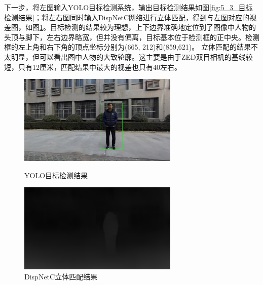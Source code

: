下一步，将左图输入YOLO目标检测系统，输出目标检测结果如图\ref{fig:5_3_目标检测结果}；将左右图同时输入DispNetC网络进行立体匹配，得到与左图对应的视差图，如图\ref{fig:5_3_立体匹配结果}。目标检测的结果较为理想，上下边界准确地定位到了图像中人物的头顶与脚下，左右边界略宽，但并没有偏离，目标基本位于检测框的正中央。检测框的左上角和右下角的顶点坐标分别为(665, 212)和(859,621)。
立体匹配的结果不太明显，但可以看出图中人物的大致轮廓。这主要是由于ZED双目相机的基线较短，只有12厘米，匹配结果中最大的视差也只有40左右。
\begin{figure}[htb] %
	\centering
	\begin{minipage}[c]{0.48\textwidth}
		\centering
		\includegraphics[width=3in]{figures/5_实验结果/left_7_detection}
		\caption{YOLO目标检测结果}\label{fig:5_3_目标检测结果}
	\end{minipage}
	\hfill
	\begin{minipage}[c]{0.48\textwidth}
		\centering
		\includegraphics[width=3in]{figures/5_实验结果/disparity}
		\caption{DispNetC立体匹配结果}\label{fig:5_3_立体匹配结果}
	\end{minipage}
\end{figure}

